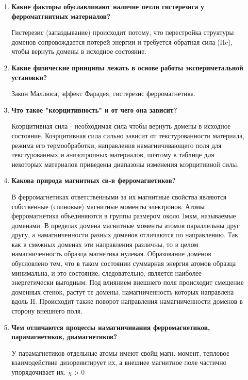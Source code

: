 \documentclass[a4paper]{article}
\begin{document}
\begin{enumerate}
    \item \textbf{Какие факторы обуславливают наличие петли гистерезиса у ферроматгнитных материалов?} \par 
    Гистерезис (запаздывание) происходит потому, что перестройка структуры доменов сопровождается потерей
    энергии и требуется обратная сила (Hc), чтобы вернуть домены в исходное состояние.
    \item \textbf{Какие физические принципы лежать в основе работы экспериметальной установки?}  \par 
        Закон Маллюса, эффект Фарадея, гистерезис ферромагнетика.
    \item \textbf{Что такое "коэрцитивность" и от чего она зависит?}  \par 
        Коэрцитивная сила - необходимая сила чтобы вернуть домены в исходное состояние. Коэрцитивная сила сильно зависит от текстурованности материала, режима его термообработки, направления намагничивающего поля для текстурованных и анизотропных материалов, поэтому в таблице для некоторых материалов приведены диапазоны изменения коэрцитивной силы. 
    \item \textbf{Какова природа магнитных св-в ферромагнетиков?}  \par 
    В ферромагнетиках ответственными за их магнитные свойства являются собственные (спиновые) магнитные моменты электронов. Атомы ферромагнетика объединяются в группы размером около 1мкм, называемые доменами. В пределах домена магнитные моменты атомов
    параллельны друг другу, а намагниченности разных
    доменов отличаются по направлению. Так как в смежных
    доменах эти направления различны, то в целом
    намагниченность образца магнетика нулевая.
    Образование доменов обусловлено тем, что в таком
    состоянии суммарная энергия атомов образца
    минимальна, и это состояние, следовательно, является
    наиболее энергетически выгодным. Под влиянием
    внешнего поля происходит смещение доменных стенок,
    растут те домены, намагниченность которых направлена вдоль H. Происходит также поворот направления намагниченности доменов в сторону внешнего поля.
    \item \textbf{Чем отличаются процессы намагничивания ферромагнетиков, парамагнетиков, диамагнетиков?}  \par  
    У парамагнетиков отдельные атомы имеют свойц магн. момент, тепловое взаимодействие дизореинтирует их, а внешнее магнитное поле частично упорядочивает их. $\chi > 0$ \par 

\end{enumerate}
\end{document}
